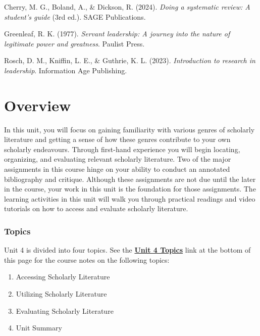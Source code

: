 \documentclass[
  letterpaper,
  DIV=11,
  numbers=noendperiod]{scrreprt}
\providecommand{\tightlist}{%
  \setlength{\itemsep}{0pt}\setlength{\parskip}{0pt}}\usepackage{longtable,booktabs,array}
\begin{document}
Cherry, M. G., Boland, A., \& Dickson, R. (2024). \emph{Doing a
systematic review: A student's guide} (3rd ed.). SAGE Publications.

Greenleaf, R. K. (1977). \emph{Servant leadership: A journey into the
nature of legitimate power and greatness}. Paulist Press.

Rosch, D. M., Kniffin, L. E., \& Guthrie, K. L. (2023).
\emph{Introduction to research in leadership}. Information Age
Publishing.


\chapter*{Overview}\label{overview-3}


In this unit, you will focus on gaining familiarity with various genres
of scholarly literature and getting a sense of how these genres
contribute to your own scholarly endeavours. Through first-hand
experience you will begin locating, organizing, and evaluating relevant
scholarly literature. Two of the major assignments in this course hinge
on your ability to conduct an annotated bibliography and critique.
Although these assignments are not due until the later in the course,
your work in this unit is the foundation for those assignments. The
learning activities in this unit will walk you through practical
readings and video tutorials on how to access and evaluate scholarly
literature.

\subsection*{Topics}\label{topics-3}

Unit 4 is divided into four topics. See the
\href{https://learn.twu.ca/mod/book/view.php?id=1176252}{\textbf{Unit 4
Topics}} link at the bottom of this page for the course notes on the
following topics:

\begin{enumerate}
\def\labelenumi{\arabic{enumi}.}
\tightlist
\item
  Accessing Scholarly Literature
\item
  Utilizing Scholarly Literature
\item
  Evaluating Scholarly Literature
\item
  Unit Summary
\end{enumerate}
\end{document}
